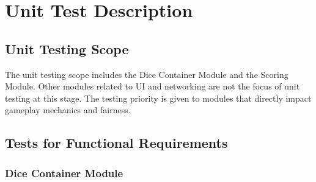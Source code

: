 \documentclass[12pt, titlepage]{article}
\begin{document}
\newpage
\section{Unit Test Description}

\subsection{Unit Testing Scope}

The unit testing scope includes the Dice Container Module and the Scoring Module. Other modules related to UI and networking are not the focus of unit testing at this stage. The testing priority is given to modules that directly impact gameplay mechanics and fairness.

\subsection{Tests for Functional Requirements}

\subsubsection{Dice Container Module}
\end{document}
